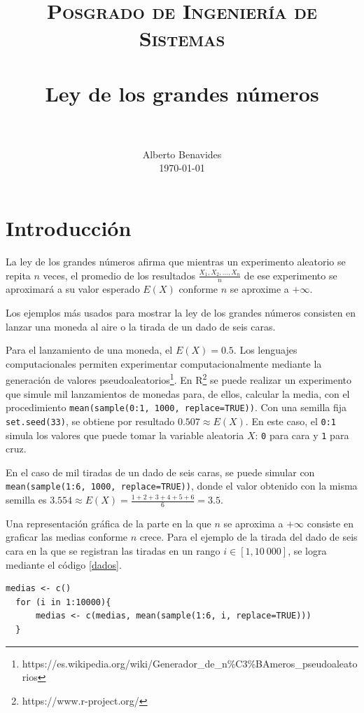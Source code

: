 \documentclass[paper=leter, fontsize=11pt]{scrartcl}
\title{
		\usefont{OT1}{bch}{b}{n}
		\normalfont \normalsize \textsc{Posgrado de Ingeniería de Sistemas} \\ [25pt]
		\horrule{0.5pt} \\[0.4cm]
		\huge Ley de los grandes números \\
		\horrule{2pt} \\[0.5cm]
}
\author{
		\normalfont 								\normalsize
        Alberto Benavides\\[-3pt]		\normalsize
        \today
}
\date{}
\begin{document}
 
\maketitle

\section{Introducción}

La ley de los grandes números afirma que mientras un experimento aleatorio se repita $n$ veces, el promedio de los resultados $\frac{X_1, X_2, \ldots, X_n}{n}$ de ese experimento se aproximará a su valor esperado $E(X)$ conforme $n$ se aproxime a $+\infty$.

Los ejemplos más usados para mostrar la ley de los grandes números consisten en lanzar una moneda al aire o la tirada de un dado de seis caras.

Para el lanzamiento de una moneda, el $E(X) = 0.5$. Los lenguajes computacionales permiten experimentar computacionalmente mediante la generación de valores pseudoaleatorios\footnote{https://es.wikipedia.org/wiki/Generador_de_n\%C3\%BAmeros_pseudoaleatorios}. En R\footnote{https://www.r-project.org/} se puede realizar un experimento que simule mil lanzamientos de monedas para, de ellos, calcular la media, con el procedimiento \texttt{mean(sample(0:1, 1000, replace=TRUE))}. Con una semilla fija \texttt{set.seed(33)}, se obtiene por resultado $0.507 \approx E(X)$. En este caso, el \texttt{0:1} simula los valores que puede tomar la variable aleatoria $X$: \texttt{0} para cara y \texttt{1} para cruz. 

En el caso de mil tiradas de un dado de seis caras, se puede simular con \texttt{mean(sample(1:6, 1000, replace=TRUE))}, donde el valor obtenido con la misma semilla es $3.554 \approx  E(X) = \frac{1 + 2 + 3 + 4 + 5 + 6}{6} = 3.5$.

Una representación gráfica de la parte en la que $n$ se aproxima a $+\infty$ consiste en graficar las medias conforme $n$ crece. Para el ejemplo de la tirada del dado de seis cara en la que se registran las tiradas en un rango $i \in [1, 10\ 000]$, se logra mediante el código \ref{dados}.

\begin{lstlisting}[caption={Medias experimentales de las tiradas de un dado de seis caras}, captionpos=t, label=dados]
  medias <- c()
  for (i in 1:10000){
      medias <- c(medias, mean(sample(1:6, i, replace=TRUE)))
  }
\end{lstlisting}
\end{document}

